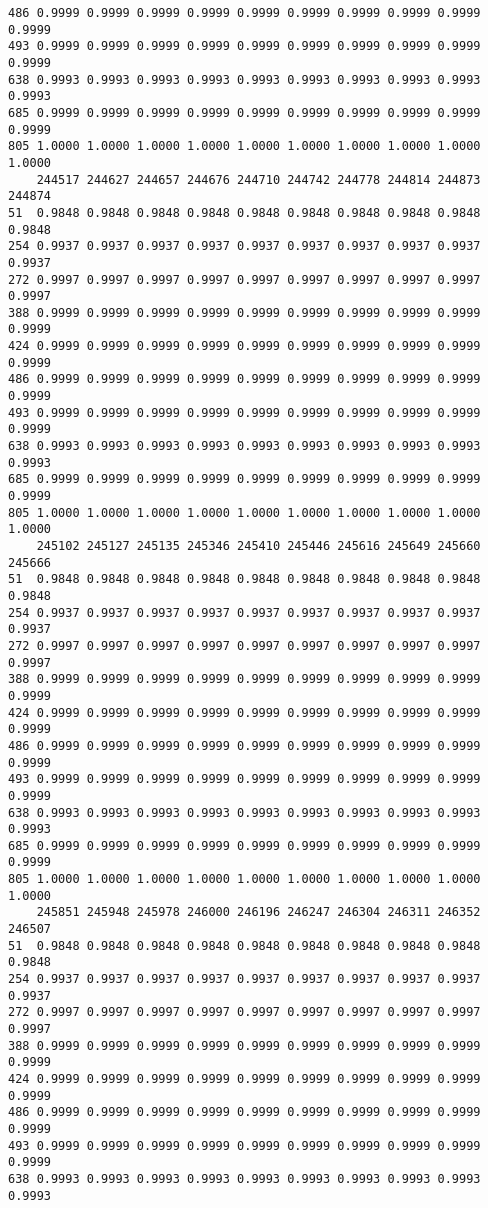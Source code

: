 \documentclass[
]{report}
\begin{document}
\begin{verbatim}
486 0.9999 0.9999 0.9999 0.9999 0.9999 0.9999 0.9999 0.9999 0.9999 0.9999
493 0.9999 0.9999 0.9999 0.9999 0.9999 0.9999 0.9999 0.9999 0.9999 0.9999
638 0.9993 0.9993 0.9993 0.9993 0.9993 0.9993 0.9993 0.9993 0.9993 0.9993
685 0.9999 0.9999 0.9999 0.9999 0.9999 0.9999 0.9999 0.9999 0.9999 0.9999
805 1.0000 1.0000 1.0000 1.0000 1.0000 1.0000 1.0000 1.0000 1.0000 1.0000
    244517 244627 244657 244676 244710 244742 244778 244814 244873 244874
51  0.9848 0.9848 0.9848 0.9848 0.9848 0.9848 0.9848 0.9848 0.9848 0.9848
254 0.9937 0.9937 0.9937 0.9937 0.9937 0.9937 0.9937 0.9937 0.9937 0.9937
272 0.9997 0.9997 0.9997 0.9997 0.9997 0.9997 0.9997 0.9997 0.9997 0.9997
388 0.9999 0.9999 0.9999 0.9999 0.9999 0.9999 0.9999 0.9999 0.9999 0.9999
424 0.9999 0.9999 0.9999 0.9999 0.9999 0.9999 0.9999 0.9999 0.9999 0.9999
486 0.9999 0.9999 0.9999 0.9999 0.9999 0.9999 0.9999 0.9999 0.9999 0.9999
493 0.9999 0.9999 0.9999 0.9999 0.9999 0.9999 0.9999 0.9999 0.9999 0.9999
638 0.9993 0.9993 0.9993 0.9993 0.9993 0.9993 0.9993 0.9993 0.9993 0.9993
685 0.9999 0.9999 0.9999 0.9999 0.9999 0.9999 0.9999 0.9999 0.9999 0.9999
805 1.0000 1.0000 1.0000 1.0000 1.0000 1.0000 1.0000 1.0000 1.0000 1.0000
    245102 245127 245135 245346 245410 245446 245616 245649 245660 245666
51  0.9848 0.9848 0.9848 0.9848 0.9848 0.9848 0.9848 0.9848 0.9848 0.9848
254 0.9937 0.9937 0.9937 0.9937 0.9937 0.9937 0.9937 0.9937 0.9937 0.9937
272 0.9997 0.9997 0.9997 0.9997 0.9997 0.9997 0.9997 0.9997 0.9997 0.9997
388 0.9999 0.9999 0.9999 0.9999 0.9999 0.9999 0.9999 0.9999 0.9999 0.9999
424 0.9999 0.9999 0.9999 0.9999 0.9999 0.9999 0.9999 0.9999 0.9999 0.9999
486 0.9999 0.9999 0.9999 0.9999 0.9999 0.9999 0.9999 0.9999 0.9999 0.9999
493 0.9999 0.9999 0.9999 0.9999 0.9999 0.9999 0.9999 0.9999 0.9999 0.9999
638 0.9993 0.9993 0.9993 0.9993 0.9993 0.9993 0.9993 0.9993 0.9993 0.9993
685 0.9999 0.9999 0.9999 0.9999 0.9999 0.9999 0.9999 0.9999 0.9999 0.9999
805 1.0000 1.0000 1.0000 1.0000 1.0000 1.0000 1.0000 1.0000 1.0000 1.0000
    245851 245948 245978 246000 246196 246247 246304 246311 246352 246507
51  0.9848 0.9848 0.9848 0.9848 0.9848 0.9848 0.9848 0.9848 0.9848 0.9848
254 0.9937 0.9937 0.9937 0.9937 0.9937 0.9937 0.9937 0.9937 0.9937 0.9937
272 0.9997 0.9997 0.9997 0.9997 0.9997 0.9997 0.9997 0.9997 0.9997 0.9997
388 0.9999 0.9999 0.9999 0.9999 0.9999 0.9999 0.9999 0.9999 0.9999 0.9999
424 0.9999 0.9999 0.9999 0.9999 0.9999 0.9999 0.9999 0.9999 0.9999 0.9999
486 0.9999 0.9999 0.9999 0.9999 0.9999 0.9999 0.9999 0.9999 0.9999 0.9999
493 0.9999 0.9999 0.9999 0.9999 0.9999 0.9999 0.9999 0.9999 0.9999 0.9999
638 0.9993 0.9993 0.9993 0.9993 0.9993 0.9993 0.9993 0.9993 0.9993 0.9993

\end{verbatim}
\end{document}
